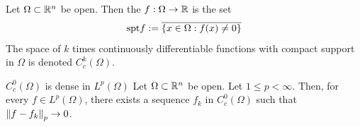 \begin{definition}
	Let $\Omega \subset \mathbb{R}^n$ be open. Then the  $f : \Omega \to \mathbb{R}$ is the set
	\begin{align*}
		\textnormal{spt} f := \overline{{\qty{x \in \Omega : f(x) \neq 0}}}
	\end{align*}
	The space of $k$ times continuously differentiable functions with compact support in $\Omega$ is denoted $C^k_c(\Omega)$.
\end{definition}
\begin{importanttheorem}{$C_c^0(\Omega)$ is dense in $L^p(\Omega)$}{}
	Let $\Omega \subset \mathbb{R}^n$ be open. Let $1 \leq p < \infty$. Then, for every $f \in L^p(\Omega)$, there exists a sequence $f_k$ in $C_c^0(\Omega)$ such that $\norm{f - f_k}_p \to 0$.
\end{importanttheorem}
\clearpage

